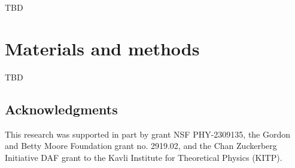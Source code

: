 \documentclass[11pt,oneside,letterpaper]{article}
\begin{document}
TBD

\section*{Materials and methods}

TBD

\subsection*{Acknowledgments}

This research was supported in part by grant NSF PHY-2309135, the Gordon and Betty Moore Foundation grant no. 2919.02, and the Chan Zuckerberg Initiative DAF grant to the Kavli Institute for Theoretical Physics (KITP).



\end{document}
